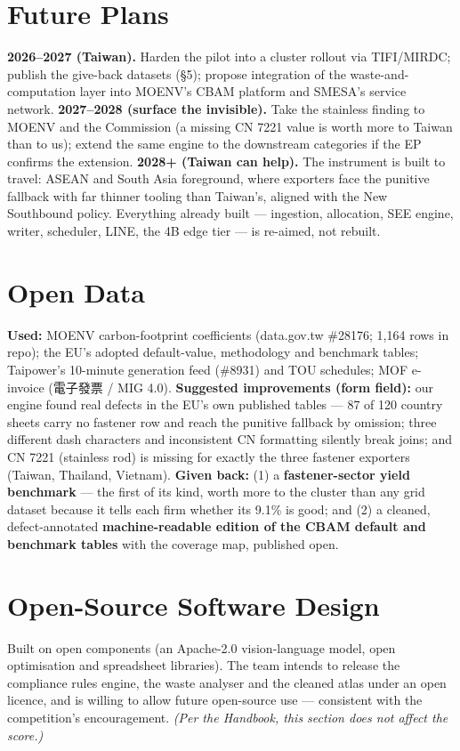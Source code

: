 \documentclass[11pt,a4paper]{article}
\begin{document}
\section{Future Plans}\label{sec:future}
\textbf{2026--2027 (Taiwan).} Harden the pilot into a cluster rollout via TIFI/MIRDC; publish the give-back datasets (\S5); propose integration of the waste-and-computation layer into MOENV's CBAM platform and SMESA's service network. \textbf{2027--2028 (surface the invisible).} Take the stainless finding to MOENV and the Commission (a missing CN 7221 value is worth more to Taiwan than to us); extend the same engine to the downstream categories if the EP confirms the extension. \textbf{2028+ (Taiwan can help).} The instrument is built to travel: ASEAN and South Asia foreground, where exporters face the punitive fallback with far thinner tooling than Taiwan's, aligned with the New Southbound policy. Everything already built --- ingestion, allocation, SEE engine, writer, scheduler, LINE, the 4B edge tier --- is re-aimed, not rebuilt.

\section{Open Data}\label{sec:opendata}
\textbf{Used:} MOENV carbon-footprint coefficients (data.gov.tw \#28176; 1{,}164 rows in repo); the EU's adopted default-value\cite{ir2621}, methodology\cite{ir2547} and benchmark tables; Taipower's 10-minute generation feed (\#8931) and TOU schedules; MOF e-invoice (電子發票 / MIG 4.0). \textbf{Suggested improvements (form field):} our engine found real defects in the EU's own published tables --- 87 of 120 country sheets carry no fastener row and reach the punitive fallback by omission; three different dash characters and inconsistent CN formatting silently break joins; and CN 7221 (stainless rod) is missing for exactly the three fastener exporters (Taiwan, Thailand, Vietnam). \textbf{Given back:} (1) a \textbf{fastener-sector yield benchmark} --- the first of its kind, worth more to the cluster than any grid dataset because it tells each firm whether its 9.1\% is good; and (2) a cleaned, defect-annotated \textbf{machine-readable edition of the CBAM default and benchmark tables} with the coverage map, published open.

\section{Open-Source Software Design}\label{sec:oss}
Built on open components (an Apache-2.0 vision-language model, open optimisation and spreadsheet libraries). The team intends to release the compliance rules engine, the waste analyser and the cleaned atlas under an open licence, and is willing to allow future open-source use --- consistent with the competition's encouragement\cite{handbook}. \emph{(Per the Handbook, this section does not affect the score.)}
\end{document}
